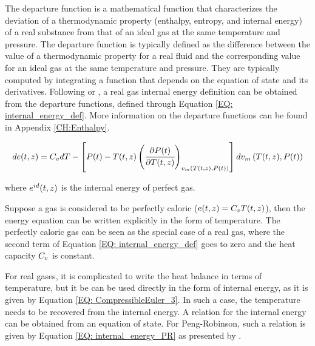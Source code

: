 \documentclass[../Article_Model_Parameters.tex]{subfiles}
\begin{document}
			The departure function is a mathematical function that characterizes the deviation of a thermodynamic property (enthalpy, entropy, and internal energy) of a real substance from that of an ideal gas at the same temperature and pressure. The departure function is typically defined as the difference between the value of a thermodynamic property for a real fluid and the corresponding value for an ideal gas at the same temperature and pressure. They are typically computed by integrating a function that depends on the equation of state and its derivatives. Following \citet{Elliott2011} or \citet{Gmehling2019}, a real gas internal energy definition can be obtained from the departure functions, defined through Equation \ref{EQ: internal_energy_def}. More information on the departure functions can be found in Appendix \ref{CH:Enthalpy}.

			{\footnotesize
				\begin{equation}
					d{\color{black}e}(t,z)=C_vd{\color{black}T}-\left[{\color{black}P}(t)-{\color{black}T}(t,z)\left(\cfrac{\partial {\color{black}P}(t)}{\partial {\color{black}T}(t,z)}\right)_{{\color{black}v_m}\left({\color{black}T}(t,z), {\color{black}P}(t)\right)}\right]d{\color{black}v_m}\left({\color{black}T}(t,z), {\color{black}P}(t)\right)
					\label{EQ: internal_energy_def}
				\end{equation} }
			
			where ${\color{black}e}^{id}(t,z)$ is the internal energy of perfect gas.
			
			Suppose a gas is considered to be perfectly caloric (${\color{black}e}(t,z)={\color{black}C_v} {\color{black}T}(t,z)$), then the energy equation can be written explicitly in the form of temperature. The perfectly caloric gas can be seen as the special case of a real gas, where the second term of Equation \ref{EQ: internal_energy_def} goes to zero and the heat capacity ${\color{black}C_v}$ is constant.
			
			For real gases, it is complicated to write the heat balance in terms of temperature, but it be can be used directly in the form of internal energy, as it is given by Equation \ref{EQ: CompressibleEuler_3}. In such a case, the temperature needs to be recovered from the internal energy. A relation for the internal energy can be obtained from an equation of state. For Peng-Robinson, such a relation is given by Equation \ref{EQ: internal_energy_PR} as presented by \citet{Elliott2011}.
			
		
\end{document}
